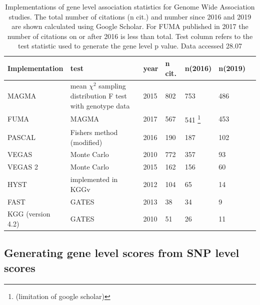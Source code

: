 
\begin{table}[]
    \centering
    \begin{tabular}{lllllll}
        \toprule
    Implementation  & test  & year &  n cit. & n(2016) & n(2019)  \\
 \midrule
  MAGMA \cite{de2015magma} & \makecell{mean $\chi^2$ sampling distribution \\ F test with genotype data}  & 2015 & 802 & 753 & 486 \\
   FUMA \cite{watanabe2017functional} & MAGMA & 2017 & 567 & 541 \footnote{(limitation of google scholar)} & 453 \\
    PASCAL \cite{lamparter2016fast} & Fishers method (modified) & 2016 & 190 & 187 & 102 \\
   VEGAS \cite{liu2010versatile} & Monte Carlo & 2010& 772 & 357 & 93 \\
    VEGAS 2 \cite{mishra2015vegas2} & Monte Carlo & 2015 & 162 & 156 & 60 \\
    HYST & implemented in KGGv\cite{li2010knowledge} & 2012 & 104 & 65 & 14\\
    FAST & GATES & 2013 & 38 & 34 & 9 \\
     KGG (version 4.2) \cite{li2010knowledge} & GATES &   2010 &      51 & 26 & 11 \\
    \bottomrule
    \end{tabular}
    \caption[Short title for list of tables test]{Implementations of gene level association statistics for Genome Wide Association studies. The total number of citations (n cit.) and number since 2016 and 2019 are shown calculated using Google Scholar.  For FUMA published in 2017 the number of citations on or after 2016 is less than total. Test column refers to the test statistic used to generate the gene level p value. Data accessed 28.07}
    \label{tab:gene_level_tests}
\end{table}

\subsection{Generating gene level scores from SNP level scores}
\label{sec:Gene level scores fron SNP level scores}

